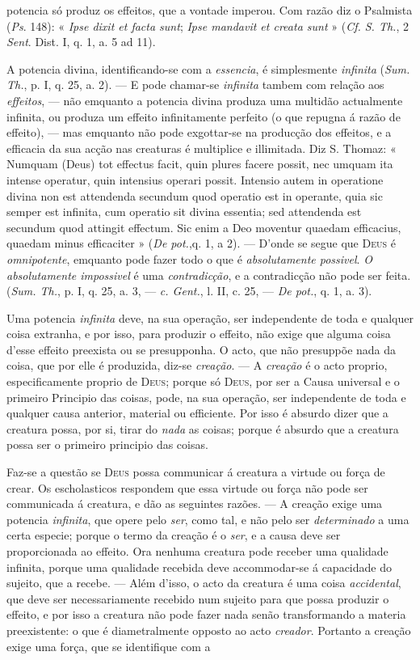potencia só produz os effeitos, que a vontade imperou. Com razão diz o Psalmista (\emph{Ps}. 148): « \emph{Ipse dixit et facta sunt}; \emph{Ipse mandavit et creata sunt} » (\emph{Cf. S. Th.}, 2 \emph{Sent}. Dist. I, q. 1, a. 5 ad 11).\par A potencia divina, identificando-se com a \emph{essencia}, é simplesmente \emph{infinita} (\emph{Sum. Th.}, p. I, q. 25, a. 2). --- E pode chamar-se \emph{infinita} tambem com relação aos \emph{effeitos}, --- não emquanto a potencia divina produza uma multidão actualmente infinita, ou produza um effeito infinitamente perfeito (o que repugna á razão de effeito), --- mas emquanto não pode exgottar-se na producção dos effeitos, e a efficacia da sua acção nas creaturas é multiplice e illimitada. Diz S. Thomaz: « Numquam (Deus) tot effectus facit, quin plures facere possit, nec umquam ita intense operatur, quin intensius operari possit. Intensio autem in operatione divina non est attendenda secundum quod operatio est in operante, quia sic semper est infinita, cum operatio sit divina essentia; sed attendenda est secundum quod attingit effectum. Sic enim a Deo moventur quaedam efficacius, quaedam minus efficaciter » (\emph{De pot.},q. 1, a 2). --- D'onde se segue que \textsc{Deus} é \emph{omnipotente}, emquanto pode fazer todo o que é \emph{absolutamente possivel}. \emph{O absolutamente impossivel} é uma \emph{contradicção}, e a contradicção não pode ser feita. (\emph{Sum. Th.}, p. I, q. 25, a. 3, --- \emph{c. Gent.}, l. II, c. 25, --- \emph{De pot.}, q. 1, a. 3).\par Uma potencia \emph{infinita} deve, na sua operação, ser independente de toda e qualquer coisa extranha, e por isso, para produzir o effeito, não exige que alguma coisa d'esse effeito preexista ou se presupponha. O acto, que não presuppõe nada da coisa, que por elle é produzida, diz-se \emph{creação}. --- A \emph{creação} é o acto proprio, especificamente proprio de \textsc{Deus}; porque só \textsc{Deus}, por ser a Causa universal e o primeiro Principio das coisas, pode, na sua operação, ser independente de toda e qualquer causa anterior, material ou efficiente. Por isso é absurdo dizer que a creatura possa, por si, tirar do \emph{nada} as coisas; porque é absurdo que a creatura possa ser o primeiro principio das coisas.\par Faz-se a questão se \textsc{Deus} possa communicar á creatura a virtude ou força de crear. Os escholasticos respondem que essa virtude ou força não pode ser communicada á creatura, e dão as seguintes razões. --- A creação exige uma potencia \emph{infinita}, que opere pelo \emph{ser}, como tal, e não pelo ser \emph{determinado} a uma certa especie; porque o termo da creação é o \emph{ser}, e a causa deve ser proporcionada ao effeito. Ora nenhuma creatura pode receber uma qualidade infinita, porque uma qualidade recebida deve accommodar-se á capacidade do sujeito, que a recebe. --- Além d'isso, o acto da creatura é uma coisa \emph{accidental}, que deve ser necessariamente recebido num sujeito para que possa produzir o effeito, e por isso a creatura não pode fazer nada senão transformando a materia preexistente: o que é diametralmente opposto ao acto \emph{creador}. Portanto a creação exige uma força, que se identifique com a 